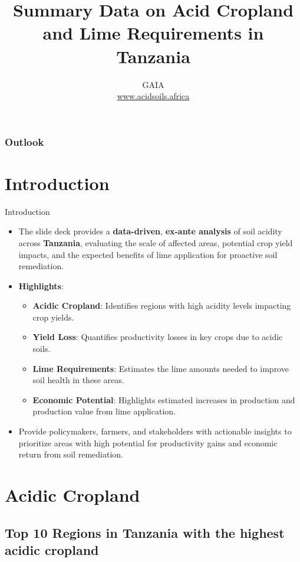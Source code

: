 \documentclass[xcolor=table, aspectratio=1610]{beamer}
\title[Tanzania--Summary]{\textsf{Summary Data on Acid Cropland and Lime Requirements in Tanzania}}
\author[GAIA]{GAIA\\ \href{www.acidsoils.africa}{www.acidsoils.africa} }
\institute[CIMMYT]
\begin{document}
\begin{frame}[plain]
\textsc{\titlepage}
\end{frame}

\begin{frame}
\frametitle{Outlook}
\tableofcontents 
\end{frame}

\section{Introduction}
\begin{frame}{Introduction}
    \begin{itemize}
        \item The slide deck provides a \textbf{data-driven}, \textbf{ex-ante analysis} of soil acidity across \textbf{Tanzania}, evaluating the scale of affected areas, potential crop yield impacts, and the expected benefits of lime application for proactive soil remediation.
        \bigskip
        \item \textbf{Highlights}:
        \begin{itemize}
            \item \textbf{Acidic Cropland}: Identifies regions with high acidity levels impacting crop yields.
            \item \textbf{Yield Loss}: Quantifies productivity losses in key crops due to acidic soils.
            \item \textbf{Lime Requirements}: Estimates the lime amounts needed to improve soil health in these areas.
            \item \textbf{Economic Potential}: Highlights estimated increases in production and production value from lime application.
        \end{itemize}
        \bigskip
        \item Provide policymakers, farmers, and stakeholders with actionable insights to prioritize areas with high potential for productivity gains and economic return from soil remediation.
    \end{itemize}
\end{frame}
\section{Acidic Cropland}
\subsection*{Top 10 Regions in Tanzania with the highest acidic cropland}
\end{document}
